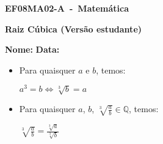 \documentclass[a4paper,14pt]{article}
\begin{document}
	
	\noindent\textbf{EF08MA02-A~-~Matemática} 
	
	\begin{center}
		\textbf{Raiz Cúbica (Versão estudante)}
	\end{center}
	
	\bigskip
	
	\noindent\textbf{Nome:} \underline{\hspace{10cm}}
    \noindent\textbf{Data:} \underline{\hspace{4cm}}
	
	\bigskip
	
	\begin{multicols}{2}
	\begin{itemize}
		\item Para quaisquer $a$ e $b$, temos:
		\begin{center}
			$a^3 = b \Leftrightarrow \sqrt[3]{b} = a$
		\end{center}
	    \item Para quaisquer $a$, $b$, $\sqrt[3]{\frac{a}{b}} \in \mathbb{Q}$, temos:
	    \begin{center}
	    	$\sqrt[3]{\frac{a}{b}} = \frac{\sqrt[3]{a}}{\sqrt[3]{b}}$
	    \end{center}  
	\end{itemize}
	\begin{enumerate}
		

\end{enumerate}
\end{multicols}
\end{document}
